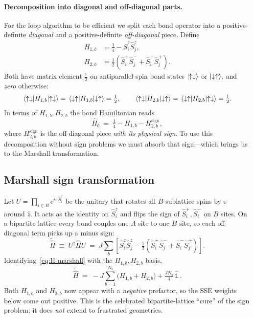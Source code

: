 \documentclass[11pt,a4paper]{article}
\newcommand{\Hop}{\hat H}
\newcommand{\Sz}{\hat S^z}
\newcommand{\Sp}{\hat S^+}
\newcommand{\Sm}{\hat S^-}
\newcommand{\Hb}{\hat H_b}
\newcommand{\Iop}{\hat{\mathbb 1}}
\newcommand{\Nb}{N_{b}}
\theoremstyle{definition}
\theoremstyle{plain}
\begin{document}
\paragraph{Decomposition into diagonal and off-diagonal parts.}
For the loop algorithm to be efficient we split each bond operator
into a positive-definite \emph{diagonal} and a positive-definite
\emph{off-diagonal} piece. Define
\begin{align}
    H_{1,b} &= \tfrac14 - \Sz_i\Sz_j, \label{eq:H1}\\
    H_{2,b} &= \tfrac12\!\left(\Sp_i\Sm_j+\Sm_i\Sp_j\right). \label{eq:H2}
\end{align}
Both have matrix element $\tfrac12$ on antiparallel-spin bond states
$\ket{\uparrow\downarrow}$ or $\ket{\downarrow\uparrow}$, and
\emph{zero} otherwise:
\begin{equation}
    \mel{\uparrow\downarrow}{H_{1,b}}{\uparrow\downarrow}
    = \mel{\downarrow\uparrow}{H_{1,b}}{\downarrow\uparrow}
    = \tfrac12,
    \qquad
    \mel{\uparrow\downarrow}{H_{2,b}}{\downarrow\uparrow}
    = \mel{\downarrow\uparrow}{H_{2,b}}{\uparrow\downarrow}
    = \tfrac12.
\end{equation}
In terms of $H_{1,b},H_{2,b}$ the bond Hamiltonian reads
\begin{equation}
    \Hb \;=\; \tfrac14 - H_{1,b} - H_{2,b}^{\text{sign}},
\end{equation}
where $H_{2,b}^{\text{sign}}$ is the off-diagonal piece \emph{with
its physical sign}. To use this decomposition without sign problems
we must absorb that sign---which brings us to the Marshall
transformation.

\subsection{Marshall sign transformation}\label{sec:marshall}
Let $U = \prod_{i\in B} e^{i\pi \Sz_i}$ be the unitary that rotates
all $B$-sublattice spins by $\pi$ around $\hat z$. It acts as the
identity on $\Sz_i$ and flips the sign of $\Sp_i,\Sm_i$ on $B$ sites.
On a bipartite lattice every bond couples one $A$ site to one $B$
site, so each off-diagonal term picks up a minus sign:
\begin{equation}\label{eq:H-marshall}
    \tilde\Hop \;\equiv\; U^\dagger \Hop U
    \;=\; J\sum_b\!\left[\Sz_i\Sz_j - \tfrac12\!\left(\Sp_i\Sm_j+\Sm_i\Sp_j\right)\right].
\end{equation}
Identifying~\cref{eq:H-marshall} with the $H_{1,b},H_{2,b}$ basis,
\begin{equation}\boxed{
    \tilde\Hop \;=\; -J\sum_{b=1}^{\Nb}\big(H_{1,b}+H_{2,b}\big)
                    + \tfrac{J\Nb}{4}\,\Iop\,. }
    \label{eq:H-marshall-final}
\end{equation}
Both $H_{1,b}$ and $H_{2,b}$ now appear with a \emph{negative}
prefactor, so the SSE weights below come out positive. This is the
celebrated bipartite-lattice ``cure'' of the sign problem; it does
\emph{not} extend to frustrated geometries.
\end{document}
